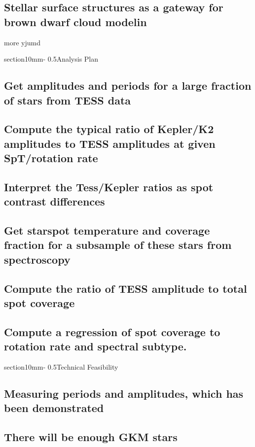 \documentclass[letterpaper,11pt]{article}
\makeatletter
\renewcommand{\section}{\@startsection%
{section}{1}{0mm}{-\baselineskip}%
{0.5\baselineskip}{\normalfont\Large\bfseries}}%
\makeatother
\begin{document}
\subsection{Stellar surface structures as a gateway for brown dwarf cloud modelin}
more yjumd

\section{Analysis Plan}

\subsection{Get amplitudes and periods for a large fraction of stars from TESS data}
\subsection{Compute the typical ratio of Kepler/K2 amplitudes to TESS amplitudes at given SpT/rotation rate}
\subsection{Interpret the Tess/Kepler ratios as spot contrast differences}
\subsection{Get starspot temperature and coverage fraction for a subsample of these stars from spectroscopy}
\subsection{Compute the ratio of TESS amplitude to total spot coverage}
\subsection{Compute a regression of spot coverage to rotation rate and spectral subtype.}


\section{Technical Feasibility}

\subsection{Measuring periods and amplitudes, which has been demonstrated}
\subsection{There will be enough GKM stars}
\end{document}
